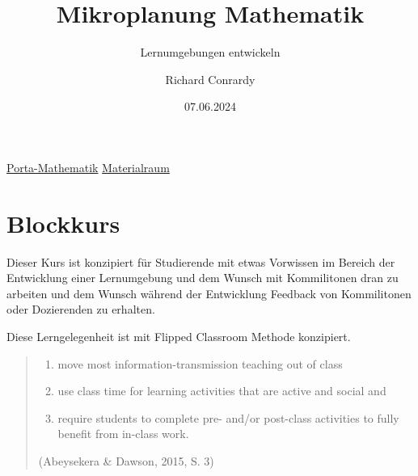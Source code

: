 \documentclass[
  10pt,
  a4paper,
  DIV=11,
  oneside]{scrartcl}
\title{Mikroplanung Mathematik}
\subtitle{Lernumgebungen entwickeln}
\author{Richard Conrardy}
\date{07.06.2024}
\providecommand{\tightlist}{%
  \setlength{\itemsep}{0pt}\setlength{\parskip}{0pt}}\usepackage{longtable,booktabs,array}
\begin{document}
\maketitle


\href{https://porta.phbern.ch/content/page/61fbb3277513396a43d9373a}{Porta-Mathematik}
\href{https://ilias.phbern.ch/goto_phbern_grp_2127034.html}{Materialraum}

\section{Blockkurs}

\begin{tcolorbox}[enhanced jigsaw, opacitybacktitle=0.6, titlerule=0mm, left=2mm, colbacktitle=quarto-callout-note-color!10!white, breakable, opacityback=0, bottomtitle=1mm, arc=.35mm, colframe=quarto-callout-note-color-frame, title=\textcolor{quarto-callout-note-color}{\faInfo}\hspace{0.5em}{Zielgruppe}, toptitle=1mm, rightrule=.15mm, colback=white, bottomrule=.15mm, toprule=.15mm, leftrule=.75mm, coltitle=black]

Dieser Kurs ist konzipiert für Studierende mit etwas Vorwissen im
Bereich der Entwicklung einer Lernumgebung und dem Wunsch mit
Kommilitonen dran zu arbeiten und dem Wunsch während der Entwicklung
Feedback von Kommilitonen oder Dozierenden zu erhalten.

\end{tcolorbox}

\begin{tcolorbox}[enhanced jigsaw, opacitybacktitle=0.6, titlerule=0mm, left=2mm, colbacktitle=quarto-callout-tip-color!10!white, breakable, opacityback=0, bottomtitle=1mm, arc=.35mm, colframe=quarto-callout-tip-color-frame, title=\textcolor{quarto-callout-tip-color}{\faLightbulb}\hspace{0.5em}{Flipped Classroom (Blockkurs)}, toptitle=1mm, rightrule=.15mm, colback=white, bottomrule=.15mm, toprule=.15mm, leftrule=.75mm, coltitle=black]

Diese Lerngelegenheit ist mit Flipped Classroom Methode konzipiert.

\begin{quote}
\begin{enumerate}
\def\labelenumi{\arabic{enumi}.}
\tightlist
\item
  move most information-transmission teaching out of class
\item
  use class time for learning activities that are active and social and
\item
  require students to complete pre- and/or post-class activities to
  fully benefit from in-class work.
\end{enumerate}

(Abeysekera \& Dawson, 2015, S. 3)
\end{quote}

\end{tcolorbox}
\end{document}

